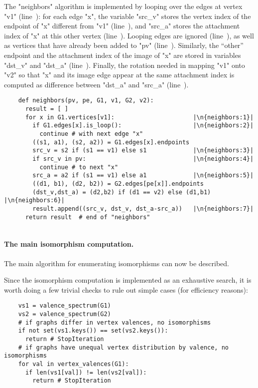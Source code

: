 The "neighbors" algorithm is implemented by looping over the edges at
vertex "v1" (line~): for each edge "x", the variable
"src_v" stores the vertex index of the endpoint of "x" different from
"v1" (line~), and "src_a" stores the attachment index
of "x" at this other vertex (line~). Looping edges are
ignored (line~), as well as vertices that have already
been added to "pv" (line~).  Similarly, the ``other''
endpoint and the attachment index of the image of "x" are stored in
variables "dst_v" and "dst_a" (line~).  Finally, the
rotation needed in mapping "v1" onto "v2" so that "x" and its image
edge appear at the same attachment index is computed as difference
between "dst_a" and "src_a" (line~).
\begin{lstlisting}
    def neighbors(pv, pe, G1, v1, G2, v2):
      result = [ ]
      for x in G1.vertices[v1]:                      |\n{neighbors:1}|
        if G1.edges[x].is_loop():                    |\n{neighbors:2}|
          continue # with next edge "x"
        ((s1, a1), (s2, a2)) = G1.edges[x].endpoints 
        src_v = s2 if (s1 == v1) else s1             |\n{neighbors:3}|
        if src_v in pv:                              |\n{neighbors:4}|
          continue # to next "x"
        src_a = a2 if (s1 == v1) else a1             |\n{neighbors:5}|
        ((d1, b1), (d2, b2)) = G2.edges[pe[x]].endpoints
        (dst_v,dst_a) = (d2,b2) if (d1 == v2) else (d1,b1) |\n{neighbors:6}|
        result.append((src_v, dst_v, dst_a-src_a))   |\n{neighbors:7}|
      return result  # end of "neighbors"
      
\end{lstlisting}

\paragraph{The main isomorphism computation.}
The main algorithm for enumerating isomorphisms can now be described.

Since the isomorphism computation is implemented as an exhaustive
search, it is worth doing a few trivial checks to rule out simple
cases (for efficiency reasons):
\begin{lstlisting}
    vs1 = valence_spectrum(G1)
    vs2 = valence_spectrum(G2)
    # if graphs differ in vertex valences, no isomorphisms
    if not set(vs1.keys()) == set(vs2.keys()):
      return # StopIteration
    # if graphs have unequal vertex distribution by valence, no isomorphisms
    for val in vertex_valences(G1):
      if len(vs1[val]) != len(vs2[val]):
        return # StopIteration

\end{lstlisting}


